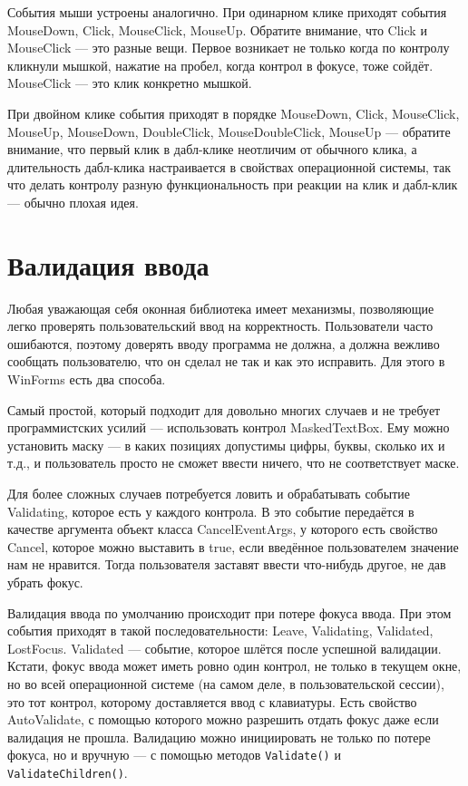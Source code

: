 \documentclass[a5paper]{article}
\begin{document}
События мыши устроены аналогично. При одинарном клике приходят события MouseDown, Click, MouseClick, MouseUp. Обратите внимание, что Click и MouseClick --- это разные вещи. Первое возникает не только когда по контролу кликнули мышкой, нажатие на пробел, когда контрол в фокусе, тоже сойдёт. MouseClick --- это клик конкретно мышкой.

При двойном клике события приходят в порядке MouseDown, Click, MouseClick, MouseUp, MouseDown, DoubleClick, MouseDoubleClick, MouseUp --- обратите внимание, что первый клик в дабл-клике неотличим от обычного клика, а длительность дабл-клика настраивается в свойствах операционной системы, так что делать контролу разную функциональность при реакции на клик и дабл-клик --- обычно плохая идея.

\section{Валидация ввода}

Любая уважающая себя оконная библиотека имеет механизмы, позволяющие легко проверять пользовательский ввод на корректность. Пользователи часто ошибаются, поэтому доверять вводу программа не должна, а должна вежливо сообщать пользователю, что он сделал не так и как это исправить. Для этого в WinForms есть два способа. 

Самый простой, который подходит для  довольно многих случаев и не требует программистских усилий --- использовать контрол MaskedTextBox. Ему можно установить маску --- в каких позициях допустимы цифры, буквы, сколько их  и т.д., и пользователь просто не сможет ввести ничего, что не соответствует маске.

Для более сложных случаев потребуется ловить и обрабатывать событие Validating, которое есть у каждого контрола. В это событие передаётся в качестве аргумента объект класса CancelEventArgs, у которого есть свойство Cancel, которое можно выставить в true, если введённое пользователем значение нам не нравится. Тогда пользователя заставят ввести что-нибудь другое, не дав убрать фокус.

Валидация ввода по умолчанию происходит при потере фокуса ввода. При этом события приходят в такой последовательности:  Leave, Validating, Validated, LostFocus. Validated --- событие, которое шлётся после успешной валидации. Кстати, фокус ввода может иметь ровно один контрол, не только в текущем окне, но во всей операционной системе (на самом деле, в пользовательской сессии), это тот контрол, которому доставляется ввод с клавиатуры. Есть свойство AutoValidate, с помощью которого можно разрешить отдать фокус даже если валидация не прошла. Валидацию можно инициировать не только по потере фокуса, но и вручную --- с помощью методов \texttt{Validate()} и \texttt{ValidateChildren()}.
\end{document}
